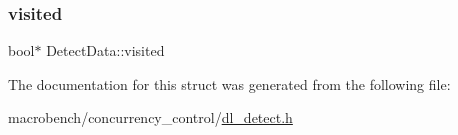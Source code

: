 \mbox{\label{structDetectData_a184e47a8dbf0ec5b7e6d56260539e5a7}} 
\subsubsection{\texorpdfstring{visited}{visited}}
{\footnotesize\ttfamily bool$\ast$ Detect\+Data\+::visited}



The documentation for this struct was generated from the following file\+:\begin{DoxyCompactItemize}
\item 
macrobench/concurrency\+\_\+control/\hyperlink{dl__detect_8h}{dl\+\_\+detect.\+h}\end{DoxyCompactItemize}
